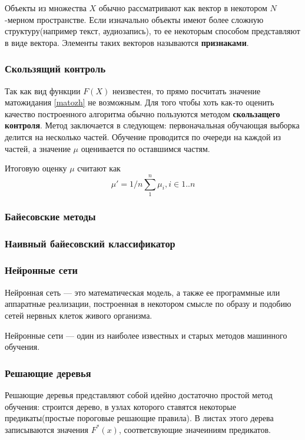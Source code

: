 Объекты из множества $X$ обычно рассматривают как вектор в некотором $N$-мерном пространстве. Если изначально объекты имеют более сложную структуру(например текст, аудиозапись), то ее некоторым способом представляют в виде вектора. Элементы таких векторов называются \textbf{признаками}.

\subsubsection{Скользящий контроль}
Так как вид функции $F(X)$  неизвестен, то прямо посчитать значение матожидания \ref{matozh} не возможным. Для того чтобы хоть как-то оценить качество построенного алгоритма обычно пользуются методом \textbf{скользащего контроля}. Метод заключается в следующем: первоначальная обучающая выборка делится на несколько частей. Обучение проводится по очереди на каждой из частей, а значение $\mu$ оценивается по оставшимся частям.

Итоговую оценку $\mu$ считают как
\begin{equation}
\mu' = 1/n\sum_1^n{\mu_i}, i \in 1..n
\end{equation}

\subsubsection{Байесовские методы}
\subsubsection{Наивный байесовский классификатор}
\subsubsection{Нейронные сети}
Нейронная сеть — это математическая модель, а также ее программные или аппаратные реализации, построенная в некотором смысле по образу и подобию сетей нервных клеток живого организма.

Нейронные сети — один из наиболее известных и старых методов машинного обучения.

\subsubsection{Решающие деревья}
Решающие деревья представляют собой идейно достаточно простой метод обучения: строится дерево, в узлах которого ставятся некоторые предикаты(простые пороговые решающие правила). В листах этого дерева записываются значения $F^*(x)$, соответсвующие значеиниям предикатов.

